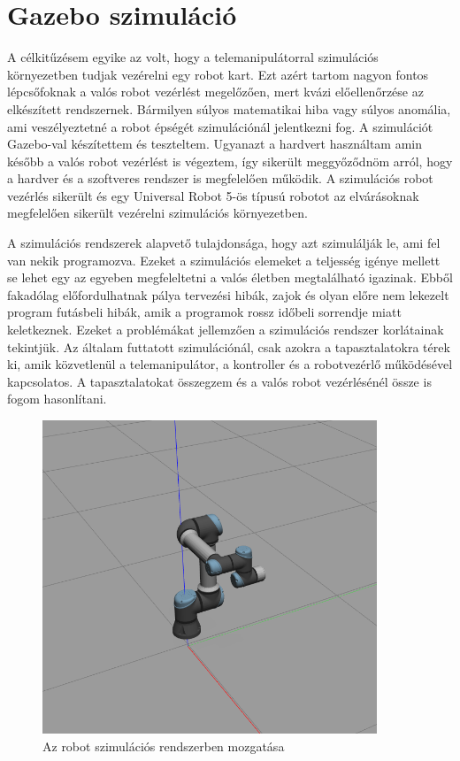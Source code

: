 \section{Gazebo szimuláció}

A célkitűzésem egyike az volt, hogy a telemanipulátorral szimulációs környezetben tudjak vezérelni egy robot kart. Ezt azért tartom nagyon fontos lépcsőfoknak a valós robot vezérlést megelőzően, mert kvázi előellenőrzése az elkészített rendszernek. Bármilyen súlyos matematikai hiba vagy súlyos anomália, ami veszélyeztetné a robot épségét szimulációnál jelentkezni fog. A szimulációt Gazebo-val készítettem és teszteltem. Ugyanazt a hardvert használtam amin később a valós robot vezérlést is végeztem, így sikerült meggyőződnöm arról, hogy a hardver és a szoftveres rendszer is megfelelően működik. A szimulációs robot vezérlés sikerült és egy Universal Robot 5-ös típusú robotot az elvárásoknak megfelelően sikerült vezérelni szimulációs környezetben.\citep{gazebo}

A szimulációs rendszerek alapvető tulajdonsága, hogy azt szimulálják le, ami fel van nekik programozva. Ezeket a szimulációs elemeket a teljesség igénye mellett se lehet egy az egyeben megfeleltetni a valós életben megtalálható igazinak. Ebből fakadólag előfordulhatnak pálya tervezési hibák, zajok és olyan előre nem lekezelt program futásbeli hibák, amik a programok rossz időbeli sorrendje miatt keletkeznek. Ezeket a problémákat jellemzően a szimulációs rendszer korlátainak tekintjük. Az általam futtatott szimulációnál, csak azokra a tapasztalatokra térek ki, amik közvetlenül a telemanipulátor, a kontroller és a robotvezérlő működésével kapcsolatos. A tapasztalatokat összegzem és a valós robot vezérlésénél össze is fogom hasonlítani.\citep{gazebo}

\begin{figure}[!ht]
\centering
\includegraphics[width=100mm, keepaspectratio]{figures/Robot/szimu}
\caption{Az robot szimulációs rendszerben mozgatása}
\label{fig:szimu_robot_mozgatas}
\end{figure}

